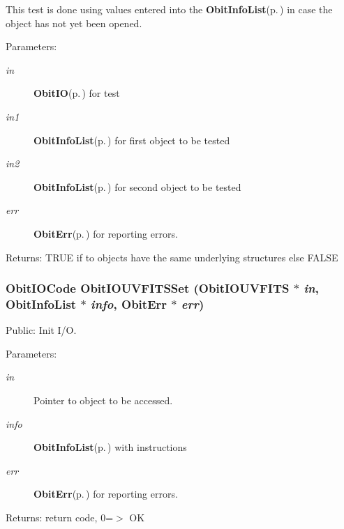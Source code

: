 This test is done using values entered into the {\bf Obit\-Info\-List}{\rm (p.\,\pageref{structObitInfoList})} in case the object has not yet been opened. \begin{Desc}
\item[Parameters:]
\begin{description}
\item[{\em in}]{\bf Obit\-IO}{\rm (p.\,\pageref{structObitIO})} for test \item[{\em in1}]{\bf Obit\-Info\-List}{\rm (p.\,\pageref{structObitInfoList})} for first object to be tested \item[{\em in2}]{\bf Obit\-Info\-List}{\rm (p.\,\pageref{structObitInfoList})} for second object to be tested \item[{\em err}]{\bf Obit\-Err}{\rm (p.\,\pageref{structObitErr})} for reporting errors. \end{description}
\end{Desc}
\begin{Desc}
\item[Returns:]TRUE if to objects have the same underlying structures else FALSE \end{Desc}
\subsubsection{\setlength{\rightskip}{0pt plus 5cm}Obit\-IOCode Obit\-IOUVFITSSet ({\bf Obit\-IOUVFITS} $\ast$ {\em in}, {\bf Obit\-Info\-List} $\ast$ {\em info}, {\bf Obit\-Err} $\ast$ {\em err})}\label{ObitIOUVFITS_8h_a12}


Public: Init I/O. 

\begin{Desc}
\item[Parameters:]
\begin{description}
\item[{\em in}]Pointer to object to be accessed. \item[{\em info}]{\bf Obit\-Info\-List}{\rm (p.\,\pageref{structObitInfoList})} with instructions \item[{\em err}]{\bf Obit\-Err}{\rm (p.\,\pageref{structObitErr})} for reporting errors. \end{description}
\end{Desc}
\begin{Desc}
\item[Returns:]return code, 0=$>$ OK \end{Desc}
